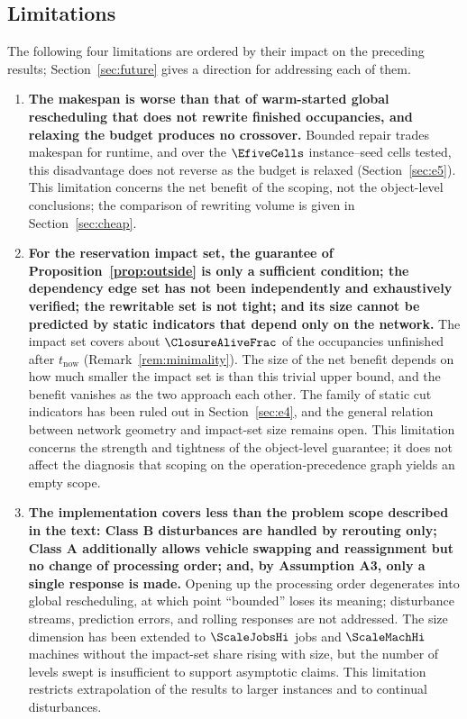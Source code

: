 \subsection{Limitations}
\label{sec:limitations}

The following four limitations are ordered by their impact on the preceding results; Section~\ref{sec:future} gives a direction for addressing each of them.

\begin{enumerate}[leftmargin=1.6em,itemsep=0.35em]
\item \textbf{The makespan is worse than that of warm-started global rescheduling that does not rewrite finished occupancies, and relaxing the budget produces no crossover.}
Bounded repair trades makespan for runtime, and over the \(\EfiveCells\) instance--seed cells tested, this disadvantage
does not reverse as the budget is relaxed (Section~\ref{sec:e5}).
This limitation concerns the net benefit of the scoping, not the object-level conclusions; the comparison of rewriting volume is given in Section~\ref{sec:cheap}.

\item \textbf{For the reservation impact set, the guarantee of Proposition~\ref{prop:outside} is only a sufficient condition; the dependency edge set has not been independently
and exhaustively verified; the rewritable set is not tight; and its size cannot be predicted by static indicators that depend only on the network.}
The impact set covers about \(\ClosureAliveFrac\) of the occupancies unfinished after \(t_{\mathrm{now}}\) (Remark~\ref{rem:minimality}).
The size of the net benefit depends on how much smaller the impact set is than this trivial upper bound, and the benefit vanishes as the two approach each other.
The family of static cut indicators has been ruled out in Section~\ref{sec:e4}, and the general relation between network geometry and impact-set size remains open.
This limitation concerns the strength and tightness of the object-level guarantee; it does not affect the diagnosis that scoping on the operation-precedence graph yields an empty scope.

\item \textbf{The implementation covers less than the problem scope described in the text: Class B disturbances are handled by rerouting only; Class A additionally allows vehicle swapping and reassignment
but no change of processing order; and, by Assumption A3, only a single response is made.}
Opening up the processing order degenerates into global rescheduling, at which point ``bounded'' loses its meaning; disturbance streams, prediction errors, and rolling responses are not addressed.
The size dimension has been extended to \(\ScaleJobsHi\) jobs and \(\ScaleMachHi\) machines without the impact-set share rising with size,
but the number of levels swept is insufficient to support asymptotic claims. This limitation restricts extrapolation of the results to larger instances and to continual disturbances.


\end{enumerate}
